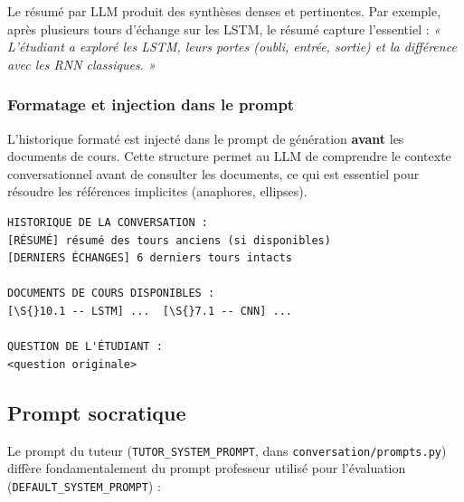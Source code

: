 Le résumé par LLM produit des synthèses denses et pertinentes. Par exemple, après plusieurs tours d'échange sur les LSTM, le résumé capture l'essentiel : \textit{« L'étudiant a exploré les LSTM, leurs portes (oubli, entrée, sortie) et la différence avec les RNN classiques. »}

\subsubsection{Formatage et injection dans le prompt}

L'historique formaté est injecté dans le prompt de génération \textbf{avant} les documents de cours. Cette structure permet au LLM de comprendre le contexte conversationnel avant de consulter les documents, ce qui est essentiel pour résoudre les références implicites (anaphores, ellipses).

\begin{lstlisting}[caption={Structure du prompt en mode conversationnel}, label={lst:prompt-conversation}]
HISTORIQUE DE LA CONVERSATION :
[RÉSUMÉ] résumé des tours anciens (si disponibles)
[DERNIERS ÉCHANGES] 6 derniers tours intacts

DOCUMENTS DE COURS DISPONIBLES :
[\S{}10.1 -- LSTM] ...  [\S{}7.1 -- CNN] ...

QUESTION DE L'ÉTUDIANT :
<question originale>
\end{lstlisting}

\subsection{Prompt socratique}

Le prompt du tuteur (\texttt{TUTOR\_SYSTEM\_PROMPT}, dans \texttt{conversation/prompts.py}) diffère fondamentalement du prompt professeur utilisé pour l'évaluation (\texttt{DEFAULT\_SYSTEM\_PROMPT}) :

